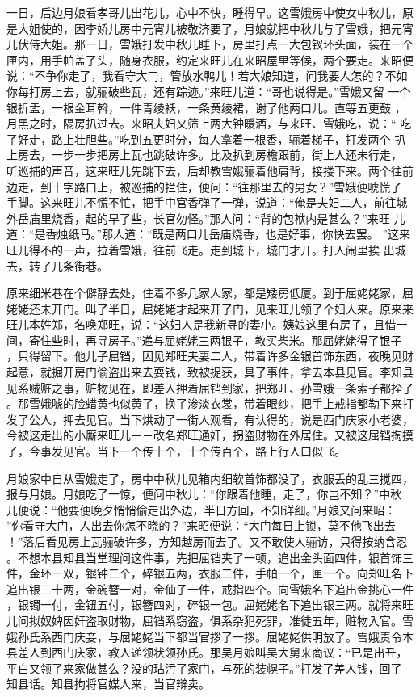 一日，后边月娘看孝哥儿出花儿，心中不快，睡得早。这雪娥房中使女中秋儿，原
是大姐使的，因李娇儿房中元宵儿被敬济要了，月娘就把中秋儿与了雪娥，把元宵
儿伏侍大姐。那一日，雪娥打发中秋儿睡下，房里打点一大包钗环头面，装在一个
匣内，用手帕盖了头，随身衣服，约定来旺儿在来昭屋里等候，两个要走。来昭便
说：“不争你走了，我看守大门，管放水鸭儿！若大娘知道，问我要人怎的？不如
你每打房上去，就骊破些瓦，还有踪迹。”来旺儿道：“哥也说得是。”雪娥又留
一个银折盂，一根金耳斡，一件青绫袄，一条黄绫裙，谢了他两口儿。直等五更鼓
，月黑之时，隔房扒过去。来昭夫妇又筛上两大钟暖酒，与来旺、雪娥吃，说：“
吃了好走，路上壮胆些。”吃到五更时分，每人拿着一根香，骊着梯子，打发两个
扒上房去，一步一步把房上瓦也跳破许多。比及扒到房檐跟前，街上人还未行走，
听巡捕的声音，这来旺儿先跳下去，后却教雪娥骊着他肩背，接搂下来。两个往前
边走，到十字路口上，被巡捕的拦住，便问：“往那里去的男女？”雪娥便唬慌了
手脚。这来旺儿不慌不忙，把手中官香弹了一弹，说道：“俺是夫妇二人，前往城
外岳庙里烧香，起的早了些，长官勿怪。”那人问：“背的包袱内是甚么？”来旺
儿道：“是香烛纸马。”那人道：“既是两口儿岳庙烧香，也是好事，你快去罢。
”这来旺儿得不的一声，拉着雪娥，往前飞走。走到城下，城门才开。打人闹里挨
出城去，转了几条街巷。

原来细米巷在个僻静去处，住着不多几家人家，都是矮房低厦。到于屈姥姥家，屈
姥姥还未开门。叫了半日，屈姥姥才起来开了门，见来旺儿领了个妇人来。原来来
旺儿本姓郑，名唤郑旺，说：“这妇人是我新寻的妻小。姨娘这里有房子，且借一
间，寄住些时，再寻房子。”递与屈姥姥三两银子，教买柴米。那屈姥姥得了银子
，只得留下。他儿子屈铛，因见郑旺夫妻二人，带着许多金银首饰东西，夜晚见财
起意，就掘开房门偷盗出来去耍钱，致被捉获，具了事件，拿去本县见官。李知县
见系贼赃之事，赃物见在，即差人押着屈铛到家，把郑旺、孙雪娥一条索子都拴了
。那雪娥唬的脸蜡黄也似黄了，换了渗淡衣裳，带着眼纱，把手上戒指都勒下来打
发了公人，押去见官。当下烘动了一街人观看，有认得的，说是西门庆家小老婆，
今被这走出的小厮来旺儿－－改名郑旺通奸，拐盗财物在外居住。又被这屈铛掏摸
了，今事发见官。当下一个传十个，十个传百个，路上行人口似飞。

月娘家中自从雪娥走了，房中中秋儿见箱内细软首饰都没了，衣服丢的乱三搅四，
报与月娘。月娘吃了一惊，便问中秋儿：“你跟着他睡，走了，你岂不知？”中秋
儿便说：“他要便晚夕悄悄偷走出外边，半日方回，不知详细。”月娘又问来昭：
”你看守大门，人出去你怎不晓的？”来昭便说：“大门每日上锁，莫不他飞出去
！”落后看见房上瓦骊破许多，方知越房而去了。又不敢使人骊访，只得按纳含忍
。不想本县知县当堂理问这件事，先把屈铛夹了一顿，追出金头面四件，银首饰三
件，金环一双，银钟二个，碎银五两，衣服二件，手帕一个，匣一个。向郑旺名下
追出银三十两，金碗簪一对，金仙子一件，戒指四个。向雪娥名下追出金挑心一件
，银镯一付，金钮五付，银簪四对，碎银一包。屈姥姥名下追出银三两。就将来旺
儿问拟奴婢因奸盗取财物，屈铛系窃盗，俱系杂犯死罪，准徒五年，赃物入官。雪
娥孙氏系西门庆妾，与屈姥姥当下都当官拶了一拶。屈姥姥供明放了。雪娥责令本
县差人到西门庆家，教人递领状领孙氏。那吴月娘叫吴大舅来商议：“已是出丑，
平白又领了来家做甚么？没的玷污了家门，与死的装幌子。”打发了差人钱，回了
知县话。知县拘将官媒人来，当官辩卖。

